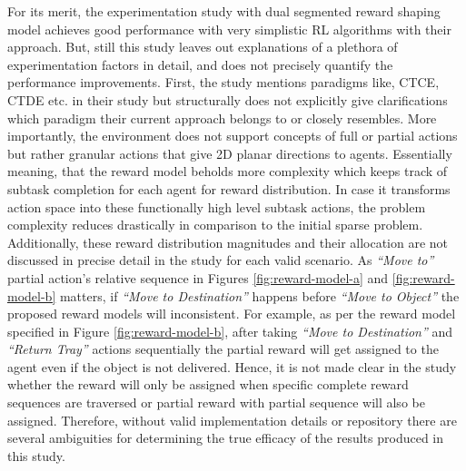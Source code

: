 \documentclass{article}
\begin{document}
For its merit, the experimentation study with dual segmented reward shaping model achieves good performance with very simplistic RL algorithms with their approach.
But, still this study leaves out explanations of a plethora of experimentation factors in detail, and does not precisely quantify the performance improvements.
First, the study mentions paradigms like, CTCE, CTDE etc. in their study but structurally does not explicitly give clarifications which paradigm their current approach belongs to or closely resembles.
More importantly, the environment does not support concepts of full or partial actions but rather granular actions that give 2D planar directions to agents.
Essentially meaning, that the reward model beholds more complexity which keeps track of subtask completion for each agent for reward distribution.
In case it transforms action space into these functionally high level subtask actions, the problem complexity reduces drastically in comparison to the initial sparse problem.
Additionally, these reward distribution magnitudes and their allocation are not discussed in precise detail in the study for each valid scenario.
As \textit{“Move to”} partial action’s relative sequence in Figures \ref{fig:reward-model-a} and \ref{fig:reward-model-b} matters, if \textit{“Move to Destination”} happens before \textit{“Move to Object”} the proposed reward models will inconsistent.
For example, as per the reward model specified in Figure \ref{fig:reward-model-b}, after taking \textit{“Move to Destination”} and \textit{“Return Tray”} actions sequentially the partial reward will get assigned to the agent even if the object is not delivered.
Hence, it is not made clear in the study whether the reward will only be assigned when specific complete reward sequences are traversed or partial reward with partial sequence will also be assigned.
Therefore, without valid implementation details or repository there are several ambiguities for determining the true efficacy of the results produced in this study.
\end{document}
